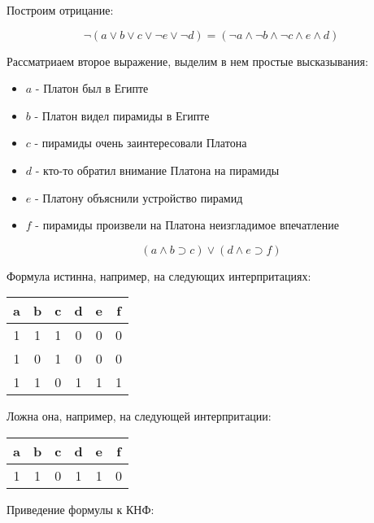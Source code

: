 \documentclass[a4paper,12pt]{article}
\begin{document}
\begin{Solution}
Построим отрицание:

\[
	\neg \left(a \vee b \vee c \vee \neg e \vee \neg d\right) = \left( \neg a \wedge \neg b \wedge \neg c \wedge e \wedge d \right)
\]

Рассматриаем второе выражение, выделим в нем простые высказывания:

\begin{itemize}
\item $a$ - Платон был в Египте

\item $b$ - Платон видел пирамиды в Египте

\item $c$ - пирамиды очень заинтересовали Платона

\item $d$ - кто-то обратил внимание Платона на пирамиды

\item $e$ - Платону объяснили устройство пирамид

\item $f$ - пирамиды произвели на Платона неизгладимое впечатление
\end{itemize}

\[
	\left(a \wedge b \supset c\right) \vee \left(d \wedge e \supset f\right)
\]

Формула истинна, например, на следующих интерпритациях:

\begin{center}
\begin{tabular}[t]{|c|c|c|c|c|c|}
\hline
        a & b & c & d & e & f \\
\hline
        1 & 1 & 1 & 0 & 0 & 0 \\
\hline
        1 & 0 & 1 & 0 & 0 & 0\\
\hline
        1 & 1 & 0 & 1 & 1 & 1\\
\hline
\end{tabular}
\end{center}

Ложна она, например, на следующей интерпритации:

\begin{center}
\begin{tabular}[t]{|c|c|c|c|c|c|}
\hline
        a & b & c & d & e & f \\
\hline
        1 & 1 & 0 & 1 & 1 & 0 \\
\hline
\end{tabular}
\end{center}


Приведение формулы к КНФ:


\end{Solution}
\end{document}
